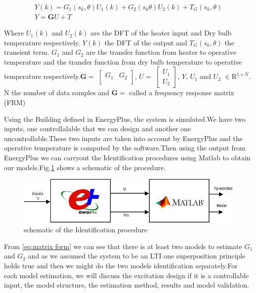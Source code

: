 \documentclass[a4paper,12pt]{report}
\numberwithin{equation}{section}
\begin{document}
\begin{gather}
Y(k)=G_{1}\left(s_{k}, \theta\right) U_{1}(k)+G_{2}\left(s_{k}\theta\right) U_{2}(k)+T_{G}\left(s_{k}, \theta\right) \label{eq:matrix form}\\
Y=\mathbf{G}U + T \label{eq:matrix form2}
\end{gather}

\noindent
Where $ U_{1}(k)$ and $ U_{2}(k)$ are the DFT of the heater input and Dry bulb temperature respectively. $Y(k)$ the DFT of the output and $T_{G}\left(s_{k}, \theta\right)$ the transient term. $G_{1}$ and $G_{2}$ are the transfer function from heater to operative temperature and the transfer function from dry bulb temperature to operative temperature respectively.$\mathbf{G}=$
 $\begin{bmatrix}
  G_{1} & G_{2}\\ 
\end{bmatrix}$, $U=$
 $\begin{bmatrix}
  U_{1}\\ 
  U_{2}
\end{bmatrix}$, $Y$, $U_{1}$ and $U_{2}$ $\in \mathrm{R}^{1 \times N}$. N the number of data samples and $\mathbf{G}=$ called a frequency response matrix (FRM)

Using the Building defined in EnergyPlus, the system is simulated.We have two inputs, one controllalable that we can design and another one uncontrollable.These two inputs are taken into account by EnergyPlus and the operative temperature is computed by the software.Then using the output from EnergyPlus we can carryout the Identification procedures using Matlab to obtain our models.Fig.\ref{fig:procedure} shows a schematic of the procedure.


\begin{figure}[H]
    \includegraphics[scale=0.7]{procedure.jpeg}
    \centering
    \caption{ schematic of the Identification procedure}
    \label{fig:procedure}
\end{figure}


From \ref{eq:matrix form} we can see that there is at least two models to estimate $G_{1}$ and $G_{2}$ and as we assumed the system to be an LTI one superposition principle holds true and then we might do the two models identification separately.For each model estimation, we will discuss the excitation design if it is a controllable input, the model structure, the estimation method, results and model validation.
\end{document}

